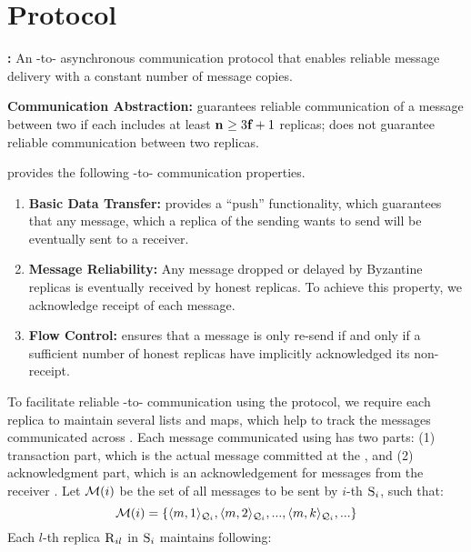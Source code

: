 \section{\Shadow{} Protocol}
\label{s:algo}





\begin{definition}\label{def:scrooge}
{\bf \Scrooge{}:}
An \RSM{}-to-\RSM{} asynchronous communication protocol that enables reliable message delivery with a constant 
number of message copies.
\end{definition}

\begin{definition}
{\bf Communication Abstraction:}
\Scrooge{} guarantees reliable communication of a message between two  if each \RSM{} includes at least $\textbf{n}_{} \ge 3\textbf{f}_{}+1$ 
replicas;
\Scrooge{} does not guarantee reliable communication between two replicas.
\end{definition}


\Scrooge{} provides the following \RSM{}-to-\RSM{} communication properties.
\begin{enumerate}
	\item \textbf{Basic Data Transfer:} \Scrooge{} provides a ``push'' functionality, which guarantees that any message, which a replica of the 
sending \RSM{} wants to send will be eventually sent to a receiver.
	\item \textbf{Message Reliability:} Any message dropped or delayed by Byzantine replicas is eventually received by honest replicas.
To achieve this property, we acknowledge receipt of each message.
	\item {\bf Flow Control:} \Scrooge{} ensures that a message is only re-send if and only if a sufficient number of honest replicas 
have implicitly acknowledged its non-receipt.
\end{enumerate}





To facilitate reliable \RSM{}-to-\RSM{} communication using the \Scrooge{} protocol, 
we require each replica to maintain several lists and maps, which
help to track the messages communicated across .
Each message communicated using \Scrooge{} has two parts: 
(1) transaction part, which is the actual message committed at the \RSM{}, and 
(2) acknowledgment part, which is an acknowledgement for messages from the receiver \RSM{}. 
Let $\mathcal{M}(i)$ be the set of all messages to be sent by $i$-th \RSM{} $\textsc{S}_{i}$, such that:
\begin{equation*}
\mathcal{M}(i) = \{\langle m, 1\rangle_{\mathcal{Q}_{i}},  \langle m, 2\rangle_{\mathcal{Q}_{i}}, ... , \langle m, k\rangle_{\mathcal{Q}_{i}}, ... \} 
\end{equation*}
Each $l$-th replica $\textsc{R}_{{i}{l}}$ in \RSM{} $\textsc{S}_{i}$ maintains following:

